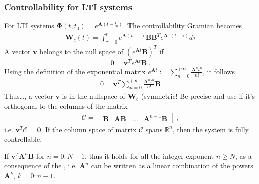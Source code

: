 \documentclass[letterpaper,10pt,english]{jupyterBook}
\begin{document}
\subsubsection*{Controllability for LTI systems}

\sphinxAtStartPar
For LTI systems \(\boldsymbol\Phi(t,t_0) = e^{\mathbf{A}(t-t_0)}\). The controllability Gramian becomes
\begin{equation*}
\begin{split}\mathbf{W}_c(t) = \int_{\tau=0}^{t} e^{\mathbf{A} (t-\tau)} \mathbf{B} \mathbf{B}^T e^{\mathbf{A}^T (t-\tau)} d \tau\end{split}
\end{equation*}
\sphinxAtStartPar
A vector \(\mathbf{v}\) belongs to the null space of \(\left( e^{\mathbf{A}t} \mathbf{B} \right)^T\) if
\begin{equation*}
\begin{split}0 = \mathbf{v}^T e^{\mathbf{A}t} \mathbf{B} \ .\end{split}
\end{equation*}
\sphinxAtStartPar
Using the definition of the exponential matrix \(e^{\mathbf{A}t} := \sum_{n=0}^{+\infty} \frac{\mathbf{A}^n t^n}{n!}\), it follows
\begin{equation*}
\begin{split}0 = \mathbf{v}^T \sum_{n=0}^{+\infty} \frac{\mathbf{A}^n t^n}{n!} \mathbf{B}\end{split}
\end{equation*}
\sphinxAtStartPar
Thus…, a vector \(\mathbf{v}\) is in the null\sphinxhyphen{}space of \(\mathbf{W}_c\) (symmetric! Be precise and use {\hyperref[\detokenize{ch/linear-algebra/matrices:math-linear-algebra-thms-raperpkah}]{}} if it’s orthogonal to the columns of the matrix
\begin{equation*}
\begin{split}\mathcal{C} = \begin{bmatrix} \mathbf{B} & \mathbf{A} \mathbf{B} & \dots & \mathbf{A}^{n-1} \mathbf{B} \end{bmatrix} \ ,\end{split}
\end{equation*}
\sphinxAtStartPar
i.e. \(\mathbf{v}^T \mathcal{C} = \mathbf{0}\). If the column space of matrix \(\mathcal{C}\) spans \(\mathbb{R}^n\), then the system is fully controllable.

\sphinxAtStartPar
{} If \(\mathbf{v}^T \mathbf{A}^n \mathbf{B}\) for \(n = 0:N-1\), thus it holds for all the integer exponent \(n \ge N\), as a consequence of the {\hyperref[\detokenize{ch/linear-algebra/cayley-hamilton:cayley-hamilton}]{}}, i.e. \(\mathbf{A}^n\) can be written as a linear combination of the powers \(\mathbf{A}^k\), \(k = 0:n-1\).
\end{document}
